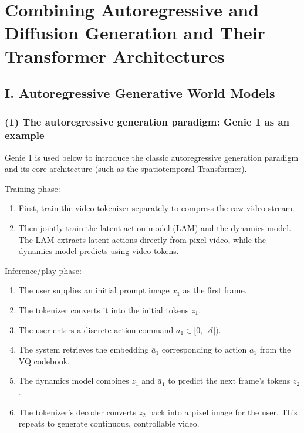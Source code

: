 \setcounter{section}{0}

\hypertarget{combining-autoregressive-and-diffusion-generation-and-their-transformer-architectures}{%
\section{Combining Autoregressive and Diffusion Generation and Their Transformer Architectures}\label{combining-autoregressive-and-diffusion-generation-and-their-transformer-architectures}}

\hypertarget{i.-autoregressive-generative-world-models}{%
\subsection{I. Autoregressive Generative World Models}\label{i.-autoregressive-generative-world-models}}

\hypertarget{the-autoregressive-generation-paradigm-genie-1-as-an-example}{%
\subsubsection{(1) The autoregressive generation paradigm: Genie 1 as an example}\label{the-autoregressive-generation-paradigm-genie-1-as-an-example}}

Genie 1 is used below to introduce the classic autoregressive generation paradigm and its core architecture (such as the spatiotemporal Transformer).

Training phase:

\begin{enumerate}
\def\labelenumi{\arabic{enumi}.}
\item
  First, train the video tokenizer separately to compress the raw video stream.
\item
  Then jointly train the latent action model (LAM) and the dynamics model. The LAM extracts latent actions directly from pixel video, while the dynamics model predicts using video tokens.
\end{enumerate}

Inference/play phase:

\begin{enumerate}
\def\labelenumi{\arabic{enumi}.}
\item
  The user supplies an initial prompt image \(x_1\) as the first frame.
\item
  The tokenizer converts it into the initial tokens \(z_1\).
\item
  The user enters a discrete action command \(a_1\in[0,|\mathcal{A}|)\).
\item
  The system retrieves the embedding \(\bar{a}_1\) corresponding to action \(a_1\) from the VQ codebook.
\item
  The dynamics model combines \(z_1\) and \(\bar{a}_1\) to predict the next frame's tokens \(z_2\).
\item
  The tokenizer's decoder converts \(z_2\) back into a pixel image for the user. This repeats to generate continuous, controllable video.
\end{enumerate}

